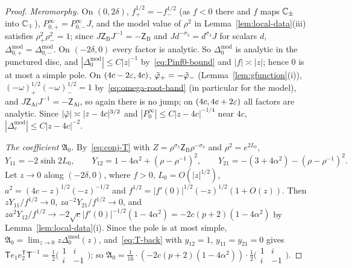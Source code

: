 \begin{proof}
\emph{Meromorphy.} On $(0,2\delta)$, $f^{1/2}_+=-f^{1/2}_-$ (as $f<0$ there and $f$ maps $\mathbb{C}_\pm$ into $\mathbb{C}_\mp$),
$P^\infty_{0,+}=P^\infty_{0,-}J$, and the model value of $\rho^2$ in Lemma~\ref{lem:local-data}(iii) satisfies
$\rho^2_+\rho^2_-=1$; since $J\mathsf Z_{\mathrm B}J^{-1}=-\mathsf Z_{\mathrm B}$ and
$Jd^{-\sigma_3}=d^{\sigma_3}J$ for scalars $d$, $\Delta^{\mathrm{mod}}_{0,+}=\Delta^{\mathrm{mod}}_{0,-}$. On $(-2\delta,0)$ every
factor is analytic. So $\Delta_0^{\mathrm{mod}}$ is analytic in the punctured disc, and $|\Delta_0^{\mathrm{mod}}|\le C|z|^{-1}$
by~\eqref{eq:Pinf0-bound} and $|f|\asymp|z|$; hence $0$ is at most a simple pole. On $(4c-2\varepsilon,4c)$,
$\tilde\varphi_+=-\tilde\varphi_-$ (Lemma~\ref{lem:gfunction}(i)), $(-\omega)^{1/2}_+(-\omega)^{1/2}_-=1$ by~\eqref{eq:omega-root-band} (in
particular for the model), and $J\mathsf Z_{\mathrm{Ai}}J^{-1}=-\mathsf Z_{\mathrm{Ai}}$, so again there is no jump; on
$(4c,4c+2\varepsilon)$ all factors are analytic. Since $|\tilde\varphi|\asymp|z-4c|^{3/2}$ and $|P^\infty_0|\le C|z-4c|^{-1/4}$ near $4c$,
$|\Delta_r^{\mathrm{mod}}|\le C|z-4c|^{-2}$.

\emph{The coefficient $\mathfrak A_0$.} By~\eqref{eq:conj-T} with $Z=\rho^{\sigma_3}\mathsf Z_{\mathrm B}\rho^{-\sigma_3}$ and $\rho^2=e^{2L_0}$,
\[
  Y_{11}=-2\sinh2L_0,\qquad Y_{12}=1-4\alpha^2+(\rho-\rho^{-1})^2,\qquad Y_{21}=-(3+4\alpha^2)-(\rho-\rho^{-1})^2 .
\]
Let $z\to0$ along $(-2\delta,0)$, where $f>0$, $L_0=O(|z|^{1/2})$, $a^2=(4c-z)^{1/2}(-z)^{-1/2}$ and
$f^{1/2}=|f'(0)|^{1/2}(-z)^{1/2}(1+O(z))$. Then $zY_{11}/f^{1/2}\to0$, $za^{-2}Y_{21}/f^{1/2}\to0$, and
$za^2Y_{12}/f^{1/2}\to-2\sqrt c|f'(0)|^{-1/2}(1-4\alpha^2)=-2c(p+2)(1-4\alpha^2)$ by Lemma~\ref{lem:local-data}(i).
Since the pole is at most simple, $\mathfrak A_0=\lim_{z\to0}z\Delta_0^{\mathrm{mod}}(z)$, and~\eqref{eq:T-back} with
$y_{12}=1$, $y_{11}=y_{21}=0$ gives $\mathsf Te_1e_2^{\mathsf T}\mathsf T^{-1}=\frac12\bigl(\begin{smallmatrix}1&i\\i&-1\end{smallmatrix}\bigr)$; so
$\mathfrak A_0=\frac1{16}\cdot(-2c(p+2)(1-4\alpha^2))\cdot\frac12\bigl(\begin{smallmatrix}1&i\\i&-1\end{smallmatrix}\bigr)$.


\end{proof}

